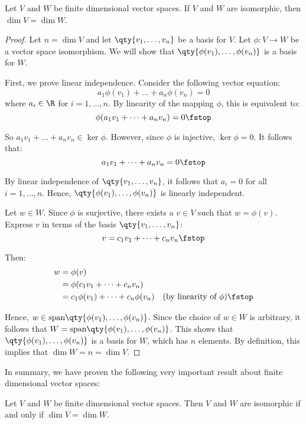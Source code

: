 \begin{proposition}
  Let \( V \) and \( W \) be finite dimensional vector spaces. If \( V \) and \( W \) are isomorphic, then \( \dim V=\dim W \).
\end{proposition}
\begin{proof}
  Let \( n=\dim V \) and let \( \qty{v_1,\dots,v_n} \) be a basis for \( V \). Let \( \phi:V\to W \) be a vector space isomorphism. We will show that \( \qty{\phi(v_1),\dots,\phi(v_n)} \) is a basis for \( W \).

  \vspace{3mm}

  First, we prove linear independence. Consider the following vector equation:
  \[ a_1\phi(v_1)+\dots+a_n\phi(v_n)=0 \]
  where \( a_i\in\R \) for \( i=1,\dots, n \). By linearity of the mapping \( \phi \), this is equivalent to:
  \[ \phi(a_1v_1+\dots+a_nv_n)=0\fstop \]
  
  So \( a_1v_1+\dots+a_nv_n\in\ker\phi \). However, since \( \phi \) is injective, \( \ker\phi=\qty{0} \). It follows that:
  \[ a_1v_1+\dots+a_nv_n=0\fstop \]
  
  By linear independence of \( \qty{v_1,\dots,v_n} \), it follows that \( a_i=0 \) for all \( i=1,\dots,n \). Hence, \( \qty{\phi(v_1),\dots,\phi(v_n)} \) is linearly independent.

  \vspace{3mm}

  Let \( w\in W \). Since \( \phi \) is surjective, there exists a \( v\in V \) such that \( w=\phi(v) \). Express \( v \) in terms of the basis \( \qty{v_1,\dots,v_n} \):
  \[ v=c_1v_1+\dots+c_nv_n\fstop \]
  
  Then:
  \begin{align*}
    w&= \phi(v)\\
    &= \phi(c_1v_1+\dots+c_nv_n)\\
    &= c_1\phi(v_1)+\dots+c_n\phi(v_n) &(\text{by linearity of }\phi)\fstop
  \end{align*}
  
  Hence, \( w\in\text{span}\qty{\phi(v_1),\dots,\phi(v_n)} \). Since the choice of \( w\in W \) is arbitrary, it follows that \( W=\text{span}\qty{\phi(v_1),\dots,\phi(v_n)} \). This shows that \( \qty{\phi(v_1),\dots,\phi(v_n)} \) is a basis for \( W \), which has \( n \) elements. By definition, this implies that \( \dim W=n=\dim V \).
\end{proof}

In summary, we have proven the following very important result about finite dimensional vector spaces:
\begin{theorem}
  \label{thm:iso-samedim}
  Let \( V \) and \( W \) be finite dimensional vector spaces. Then \( V \) and \( W \) are isomorphic if and only if \( \dim V=\dim W \).
\end{theorem}

